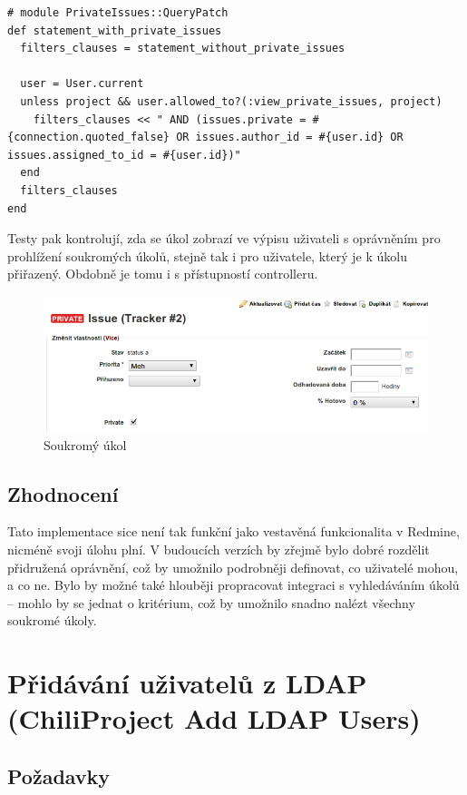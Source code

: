 \documentclass[thesis=B,czech]{FITthesis}[2012/05/02]
\begin{document}
\begin{lstlisting}
# module PrivateIssues::QueryPatch
def statement_with_private_issues
  filters_clauses = statement_without_private_issues

  user = User.current
  unless project && user.allowed_to?(:view_private_issues, project)
    filters_clauses << " AND (issues.private = #{connection.quoted_false} OR issues.author_id = #{user.id} OR issues.assigned_to_id = #{user.id})"
  end
  filters_clauses
end
\end{lstlisting}
Testy pak kontrolují, zda se úkol zobrazí ve výpisu uživateli
s oprávněním pro prohlížení soukromých úkolů, stejně tak i pro uživatele,
který je k úkolu přiřazený. Obdobně je tomu i s přístupností
controlleru.

\begin{figure}[tbp]
\centering
\centerline{\includegraphics[width=1.2\textwidth]{issues-gui1.png}}
\caption{Soukromý úkol}
\end{figure}

\subsection{Zhodnocení}

Tato implementace sice není tak funkční jako vestavěná funkcionalita
v Redmine, nicméně svoji úlohu plní. V budoucích verzích by zřejmě bylo
dobré rozdělit přidružená oprávnění, což by umožnilo podrobněji
definovat, co uživatelé mohou, a co ne. Bylo by možné také hlouběji
propracovat integraci s vyhledáváním úkolů -- mohlo by se jednat
o kritérium, což by umožnilo snadno nalézt všechny soukromé úkoly.

\section[Přidávání uživatelů z LDAP]{Přidávání uživatelů z LDAP (ChiliProject Add LDAP Users)}
\label{sec:add_ldap_users}

\subsection{Požadavky}
\end{document}
